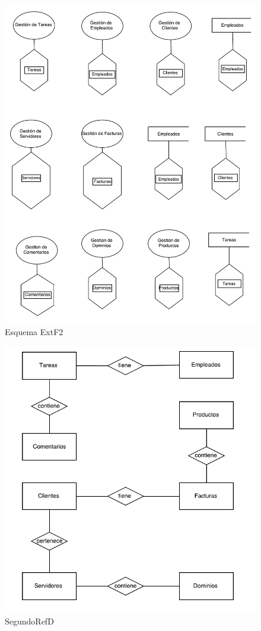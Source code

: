 \documentclass[paper=a4, fontsize=11pt, spanish]{scrartcl}
\begin{document}
\begin{figure}
	\includegraphics[width=1.20\textwidth]{EsqExtF_2.png}
	\caption{Esquema ExtF2}
	\label{fig:EsqExtF_2}
\end{figure}

\begin{figure}
	\includegraphics[width=1.20\textwidth]{SegundoRefD.png}
	\caption{SegundoRefD}
	\label{fig:SegundoRefD}
\end{figure}
\end{document}

